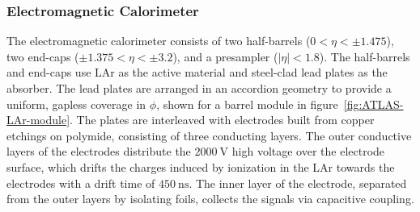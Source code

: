 \subsubsection{Electromagnetic Calorimeter}\label{sec:ATLAS-calorimeters-ecal}
The electromagnetic calorimeter consists of two half-barrels ($0<\eta<\pm1.475$), two end-caps ($\pm1.375<\eta<\pm3.2$), and a presampler ($|\eta|<1.8$). The half-barrels and end-caps use LAr as the active material and steel-clad lead plates as the absorber. The lead plates are arranged in an accordion geometry to provide a uniform, gapless coverage in $\phi$, shown for a barrel module in figure~\ref{fig:ATLAS-LAr-module}. The plates are interleaved with electrodes built from copper etchings on polymide, consisting of three conducting layers. The outer conductive layers of the electrodes distribute the $\SI{2000}{\volt}$ high voltage over the electrode surface, which drifts the charges induced by ionization in the LAr towards the electrodes with a drift time of $\SI{450}{\nano\second}$. The inner layer of the electrode, separated from the outer layers by isolating foils, collects the signals via capacitive coupling. 

